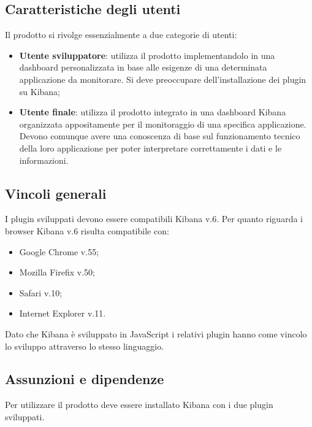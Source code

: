 	\subsection{Caratteristiche degli utenti}
	Il prodotto si rivolge essenzialmente a due categorie di utenti:
	\begin{itemize}
		\item \textbf{Utente sviluppatore}: utilizza il prodotto implementandolo in una dashboard personalizzata in base alle esigenze di una determinata applicazione da monitorare. Si deve preoccupare dell'installazione dei plugin su Kibana;
		\item \textbf{Utente finale}: utilizza il prodotto integrato in una dashboard Kibana organizzata appositamente per il monitoraggio di una specifica applicazione. Devono comunque avere una conoscenza di base sul funzionamento tecnico della loro applicazione per poter interpretare correttamente i dati e le informazioni.
	\end{itemize}
	\subsection{Vincoli generali}
	I plugin sviluppati devono essere compatibili  Kibana v.6.
	Per quanto riguarda i browser Kibana v.6 risulta compatibile con: 
	\begin{itemize}
		\item Google Chrome v.55;
		\item Mozilla Firefix v.50;
		\item Safari v.10;
		\item Internet Explorer v.11.
	\end{itemize}
	Dato che Kibana è sviluppato in JavaScript i relativi plugin hanno come vincolo lo sviluppo attraverso lo stesso linguaggio.
	
	\subsection{Assunzioni e dipendenze}
	Per utilizzare il prodotto deve essere installato Kibana con i due plugin sviluppati. 
	
